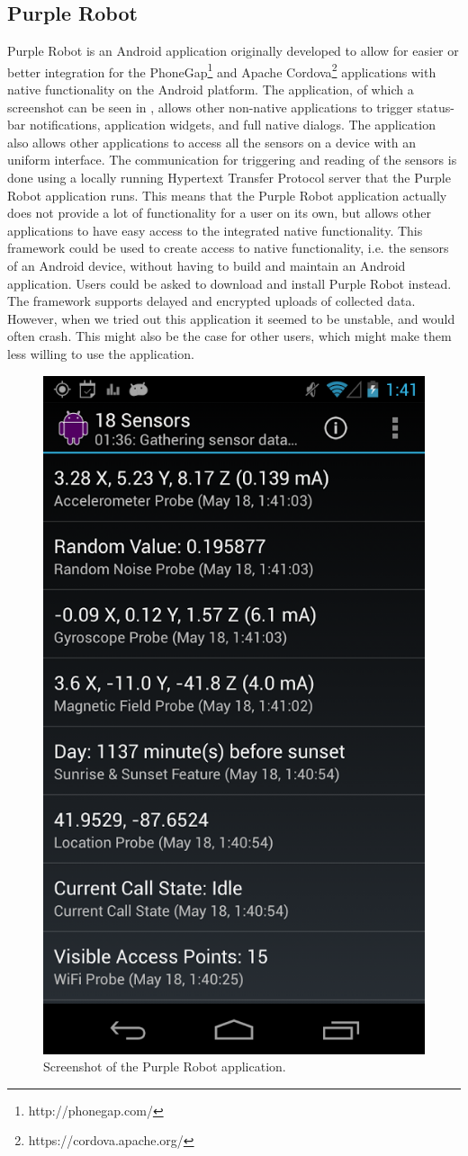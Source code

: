 \subsection{Purple Robot}
\label{sub:purple_robot} 
Purple Robot \parencite{purple_robot} is an Android application originally developed to allow for easier or better integration for the PhoneGap\footnote{http://phonegap.com/} and Apache Cordova\footnote{https://cordova.apache.org/} applications with native functionality on the Android platform. The application, of which a screenshot can be seen in , allows other non-native applications to trigger status-bar notifications, application widgets, and full native dialogs. The application also allows other applications to access all the sensors on a device with an uniform interface. The communication for triggering and reading of the sensors is done using a locally running Hypertext Transfer Protocol server that the Purple Robot application runs. This means that the Purple Robot application actually does not provide a lot of functionality for a user on its own, but allows other applications to have easy access to the integrated native functionality. This framework could be used to create access to native functionality, i.e. the sensors of an Android device, without having to build and maintain an Android application. Users could be asked to download and install Purple Robot instead. The framework supports delayed and encrypted uploads of collected data. However, when we tried out this application it seemed to be unstable, and would often crash. This might also be the case for other users, which might make them less willing to use the application.

\begin{figure}[!htbp]
	\centering
	\includegraphics[height=0.5\textwidth]{graphic/existing_solutions/purple_robot.png}
	\caption[]{Screenshot of the Purple Robot application\parencite{purple_robot_google_play_store}.}
	\label{fig:purple_robot_screenshot}
\end{figure}
\FloatBarrier

